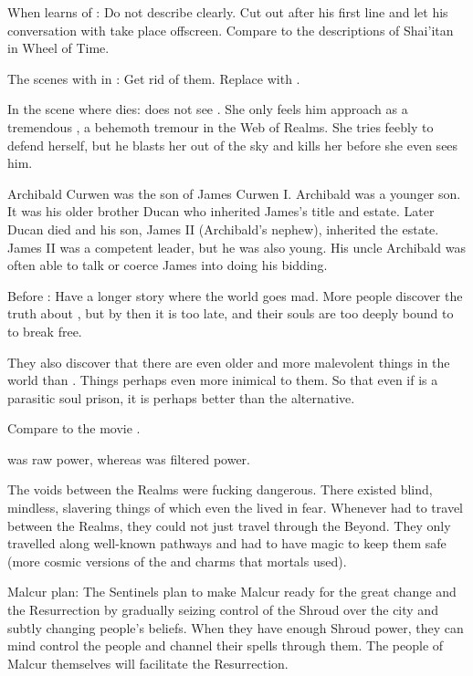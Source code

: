 When \Ishnaruchaefir learns of \Urizeth:
  Do not describe \Ishnaruchaefir clearly.
  Cut out after his first line and let his conversation with \Criseis take place offscreen.
  Compare to the descriptions of Shai'itan in Wheel of Time. 

The scenes with \Ishnaruchaefir in \Azmith:
  Get rid of them. 
  Replace \Ishnaruchaefir with \Criseis. 

In the scene where \Urizeth dies:
  \Urizeth does not see \Ishnaruchaefir.
  She only feels him approach as a tremendous \vertex, a behemoth tremour in the Web of Realms. 
  She tries feebly to defend herself, but he blasts her out of the sky and kills her before she even sees him.

Archibald Curwen was the son of James Curwen I. 
Archibald was a younger son. 
It was his older brother Ducan who inherited James's title and estate. 
Later Ducan died and his son, James II (Archibald's nephew), inherited the estate. 
James II was a competent leader, but he was also young. 
His uncle Archibald was often able to talk or coerce James into doing his bidding. 

Before \Lithrim:
  Have a longer story where the world goes mad. 
  More people discover the truth about \iquin, but by then it is too late, and their souls are too deeply bound to \iquin to break free. 
  
  They also discover that there are even older and more malevolent things in the world than \iquin.
  Things perhaps even more inimical to them.
  So that even if \iquin is a parasitic soul prison, it is perhaps better than the alternative. 
  
  Compare to the movie \cite{Movie:IntheMouthofMadness}. 

\Itzach was raw \bane power, whereas \iquin was filtered \bane power. 

The voids between the Realms were fucking dangerous. 
There existed blind, mindless, slavering things of which even the \resphain lived in fear. 
Whenever \resphain had to travel between the Realms, they could not just travel through the Beyond.
They only travelled along well-known pathways and had to have magic to keep them safe (more cosmic versions of the \eidola and \wylde charms that mortals used).

Malcur plan:
  The Sentinels plan to make Malcur ready for the great change and the Resurrection by gradually seizing control of the Shroud over the city and subtly changing people's beliefs. 
  When they have enough Shroud power, they can mind control the people and channel their spells through them. 
  The people of Malcur themselves will facilitate the Resurrection. 
  
